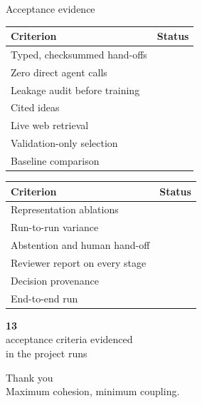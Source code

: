 \documentclass[10pt,aspectratio=169]{beamer}
\newcommand{\ok}{\textcolor{stgood}{\ding{51}}}
\newcommand{\stattile}[3][0.22]{%
  \begin{minipage}[t]{#1\linewidth}\centering
    {\usebeamercolor[fg]{title}\fontsize{17}{20}\selectfont\bfseries #2}\\[0.2em]
    {\scriptsize #3}
  \end{minipage}}
\renewcommand{\arraystretch}{1.15}%
\begin{document}
\begin{frame}{Acceptance evidence}
  \centering
  \scriptsize
  \renewcommand{\arraystretch}{1.15}
  \setlength{\tabcolsep}{5pt}
  \begin{tabular}[t]{@{}lc@{}}
    \toprule
    \textbf{Criterion} & \textbf{Status} \\
    \midrule
    Typed, checksummed hand-offs        & \ok \\
    Zero direct agent calls             & \ok \\
    Leakage audit before training       & \ok \\
    Cited ideas                         & \ok \\
    Live web retrieval                  & \ok \\
    Validation-only selection           & \ok \\
    Baseline comparison                 & \ok \\
    \bottomrule
  \end{tabular}
  \hspace{2em}
  \begin{tabular}[t]{@{}lc@{}}
    \toprule
    \textbf{Criterion} & \textbf{Status} \\
    \midrule
    Representation ablations            & \ok \\
    Run-to-run variance                 & \ok \\
    Abstention and human hand-off       & \ok \\
    Reviewer report on every stage      & \ok \\
    Decision provenance                 & \ok \\
    End-to-end run                      & \ok \\
    \bottomrule
  \end{tabular}

  \vspace{1.0em}
  \stattile[0.4]{\textcolor{stgood}{13}}{acceptance criteria evidenced\\in the project runs}
\end{frame}

\begin{frame}[plain]
  \begin{center}
    \vspace{1.2cm}
    {\Huge Thank you}\\[0.6cm]
    {\large Maximum cohesion, minimum coupling.}
  \end{center}
\end{frame}
\end{document}

